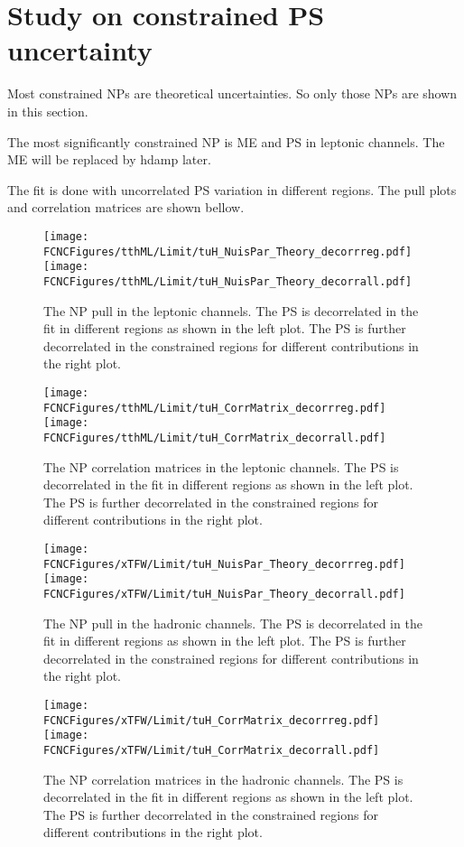 \section{Study on constrained PS uncertainty}
Most constrained NPs are theoretical uncertainties. So only those NPs are shown in this section.

The most significantly constrained NP is ME and PS in leptonic channels. The ME will be replaced by hdamp later.

The fit is done with uncorrelated PS variation in different regions. The pull plots and correlation matrices are shown bellow.

\begin{figure}[H]
\centering
\texttt{[image: \\FCNCFigures/tthML/Limit/tuH\_NuisPar\_Theory\_decorrreg.pdf]}
\texttt{[image: \\FCNCFigures/tthML/Limit/tuH\_NuisPar\_Theory\_decorrall.pdf]}
\caption{ The NP pull in the leptonic channels. The PS is decorrelated in the fit in different regions as shown in the left plot. The PS is further decorrelated in the constrained regions for different contributions in the right plot. }
\label{fig:tuH_NuisPar_decorr}
\end{figure}


\begin{figure}[H]
\centering
\texttt{[image: \\FCNCFigures/tthML/Limit/tuH\_CorrMatrix\_decorrreg.pdf]}
\texttt{[image: \\FCNCFigures/tthML/Limit/tuH\_CorrMatrix\_decorrall.pdf]}
\caption{ The NP correlation matrices in the leptonic channels. The PS is decorrelated in the fit in different regions as shown in the left plot. The PS is further decorrelated in the constrained regions for different contributions in the right plot. }
\label{fig:tuH_CorrMatrix_decorr}
\end{figure}


\begin{figure}[H]
\centering
\texttt{[image: \\FCNCFigures/xTFW/Limit/tuH\_NuisPar\_Theory\_decorrreg.pdf]}
\texttt{[image: \\FCNCFigures/xTFW/Limit/tuH\_NuisPar\_Theory\_decorrall.pdf]}
\caption{ The NP pull in the hadronic channels. The PS is decorrelated in the fit in different regions as shown in the left plot. The PS is further decorrelated in the constrained regions for different contributions in the right plot. }
\label{fig:tuH_NuisPar_decorr}
\end{figure}


\begin{figure}[H]
\centering
\texttt{[image: \\FCNCFigures/xTFW/Limit/tuH\_CorrMatrix\_decorrreg.pdf]}
\texttt{[image: \\FCNCFigures/xTFW/Limit/tuH\_CorrMatrix\_decorrall.pdf]}
\caption{ The NP correlation matrices in the hadronic channels. The PS is decorrelated in the fit in different regions as shown in the left plot. The PS is further decorrelated in the constrained regions for different contributions in the right plot. }
\label{fig:tuH_CorrMatrix_decorr}
\end{figure}